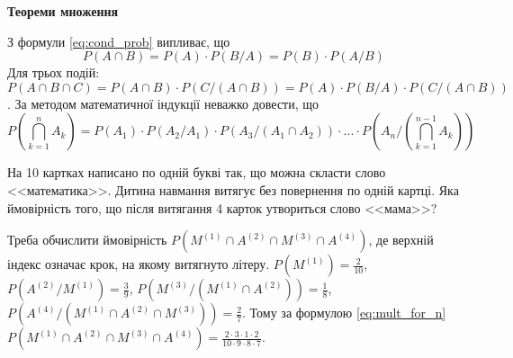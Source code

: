 \noindent \textbf{Теореми множення}

З формули \eqref{eq:cond_prob} випливає, що
\begin{equation}\label{eq:mult_for_2}
    P(A\cap B) = P(A)\cdot P(B/A) = P(B) \cdot P(A/B)
\end{equation}
Для трьох подій: $P(A \cap B \cap C) = P(A\cap B) \cdot P(C/(A\cap B)) = P(A)\cdot P(B/A) \cdot P(C/(A\cap B))$.
За методом математичної індукції неважко довести, що
\begin{equation}\label{eq:mult_for_n}
    P\left( \bigcap\limits_{k=1}^{n} A_k\right) = P\left(A_1\right) \cdot P\left(A_2/A_1\right) \cdot P\left( A_3 / \left( A_1 \cap A_2\right)\right) \cdot ... \cdot P\left( A_n / \left( \bigcap\limits_{k=1}^{n-1} A_k\right) \right)
\end{equation}

\begin{example}
    На 10 картках написано по одній букві так, що можна скласти слово <<математика>>.
    Дитина навмання витягує без повернення по одній картці. Яка ймовірність того, що після витягання 4 карток
    утвориться слово <<мама>>?

    Треба обчислити ймовірність $P(M^{(1)} \cap A^{(2)} \cap M^{(3)} \cap A^{(4)})$,
    де верхній індекс означає крок, на якому витягнуто літеру.
    $P(M^{(1)}) = \frac{2}{10}$, $P(A^{(2)} / M^{(1)}) = \frac{3}{9}$,
    $P(M^{(3)}/(M^{(1)} \cap A^{(2)})) = \frac{1}{8}$, $P(A^{(4)} / (M^{(1)} \cap A^{(2)} \cap M^{(3)})) = \frac{2}{7}$.
    Тому за формулою \eqref{eq:mult_for_n} $P(M^{(1)} \cap A^{(2)} \cap M^{(3)} \cap A^{(4)}) = \frac{2 \cdot 3 \cdot 1 \cdot 2}{10 \cdot 9 \cdot 8 \cdot 7}$.
\end{example}


